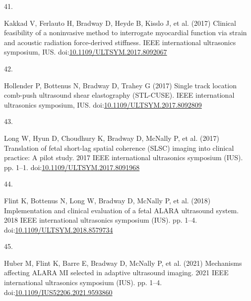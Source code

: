 \documentclass[
]{article}
\newlength{\cslhangindent}
\newlength{\csllabelwidth}
\newlength{\cslentryspacingunit} %
\newenvironment{CSLReferences}[2] %
 {%
  \setlength{\parindent}{0pt}
  \ifodd #1
  \let\oldpar\par
  \def\par{\hangindent=\cslhangindent\oldpar}
  \fi
  \setlength{\parskip}{#2\cslentryspacingunit}
 }%
 {}
\newcommand{\CSLLeftMargin}[1]{\parbox[t]{\csllabelwidth}{#1}}
\newcommand{\CSLRightInline}[1]{\parbox[t]{\linewidth - \csllabelwidth}{#1}\break}
\begin{document}
\begin{CSLReferences}{0}{0}
\leavevmode{}%
\CSLLeftMargin{41. }
\CSLRightInline{Kakkad V, Ferlauto H, Bradway D, Heyde B, Kisslo J, et
al. (2017) {Clinical feasibility of a noninvasive method to interrogate
myocardial function via strain and acoustic radiation force-derived
stiffness}. IEEE international ultrasonics symposium, IUS.
doi:\href{https://doi.org/10.1109/ULTSYM.2017.8092067}{10.1109/ULTSYM.2017.8092067}}

\leavevmode{}%
\CSLLeftMargin{42. }
\CSLRightInline{Hollender P, Bottenus N, Bradway D, Trahey G (2017)
{Single track location comb-push ultrasound shear elastography
(STL-CUSE)}. IEEE international ultrasonics symposium, IUS.
doi:\href{https://doi.org/10.1109/ULTSYM.2017.8092809}{10.1109/ULTSYM.2017.8092809}}

\leavevmode{}%
\CSLLeftMargin{43. }
\CSLRightInline{Long W, Hyun D, Choudhury K, Bradway D, McNally P, et
al. (2017) Translation of fetal short-lag spatial coherence (SLSC)
imaging into clinical practice: A pilot study. 2017 IEEE international
ultrasonics symposium (IUS). pp. 1--1.
doi:\href{https://doi.org/10.1109/ULTSYM.2017.8091968}{10.1109/ULTSYM.2017.8091968}}

\leavevmode{}%
\CSLLeftMargin{44. }
\CSLRightInline{Flint K, Bottenus N, Long W, Bradway D, McNally P, et
al. (2018) Implementation and clinical evaluation of a fetal ALARA
ultrasound system. 2018 IEEE international ultrasonics symposium (IUS).
pp. 1--4.
doi:\href{https://doi.org/10.1109/ULTSYM.2018.8579734}{10.1109/ULTSYM.2018.8579734}}

\leavevmode{}%
\CSLLeftMargin{45. }
\CSLRightInline{Huber M, Flint K, Barre E, Bradway D, McNally P, et al.
(2021) Mechanisms affecting ALARA MI selected in adaptive ultrasound
imaging. 2021 IEEE international ultrasonics symposium (IUS). pp. 1--4.
doi:\href{https://doi.org/10.1109/IUS52206.2021.9593860}{10.1109/IUS52206.2021.9593860}}

\end{CSLReferences}
\end{document}
